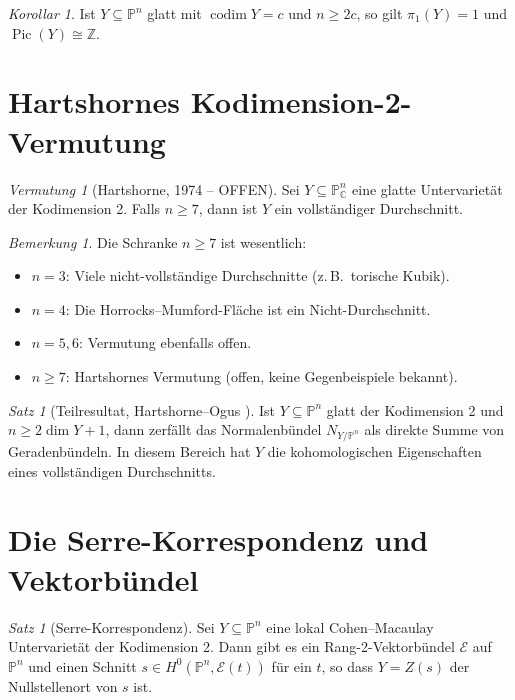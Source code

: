 \documentclass[12pt,a4paper]{amsart}
\theoremstyle{definition}
\theoremstyle{remark}
\newtheorem{satz}[theorem]{Satz}
\newtheorem{korollar}[theorem]{Korollar}
\newtheorem{vermutung}[theorem]{Vermutung}
\newtheorem{bemerkung}[theorem]{Bemerkung}
\DeclareMathOperator{\codim}{codim}
\DeclareMathOperator{\Pic}{Pic}
\newcommand{\PP}{\mathbb{P}}
\newcommand{\ZZ}{\mathbb{Z}}
\newcommand{\CC}{\mathbb{C}}
\begin{document}
\begin{korollar}
Ist $Y \subseteq \PP^n$ glatt mit $\codim Y = c$ und $n \ge 2c$, so gilt
$\pi_1(Y) = 1$ und $\Pic(Y) \cong \ZZ$.
\end{korollar}

\section{Hartshornes Kodimension-2-Vermutung}

\begin{vermutung}[Hartshorne, 1974 \cite{Hartshorne1974} -- OFFEN]
\label{verm:hartshorne}
Sei $Y \subseteq \PP^n_\CC$ eine glatte Untervarietät der Kodimension 2.
Falls $n \ge 7$, dann ist $Y$ ein vollständiger Durchschnitt.
\end{vermutung}

\begin{bemerkung}
Die Schranke $n \ge 7$ ist wesentlich:
\begin{itemize}
  \item $n = 3$: Viele nicht-vollständige Durchschnitte (z.\,B.\ torische Kubik).
  \item $n = 4$: Die Horrocks--Mumford-Fläche ist ein Nicht-Durchschnitt.
  \item $n = 5, 6$: Vermutung ebenfalls offen.
  \item $n \ge 7$: Hartshornes Vermutung (offen, keine Gegenbeispiele bekannt).
\end{itemize}
\end{bemerkung}

\begin{satz}[Teilresultat, Hartshorne--Ogus \cite{HartshorneOgus1974}]
Ist $Y \subseteq \PP^n$ glatt der Kodimension 2 und $n \ge 2\dim Y + 1$,
dann zerfällt das Normalenbündel $N_{Y/\PP^n}$ als direkte Summe von
Geradenbündeln.  In diesem Bereich hat $Y$ die kohomologischen Eigenschaften
eines vollständigen Durchschnitts.
\end{satz}

\section{Die Serre-Korrespondenz und Vektorbündel}

\begin{satz}[Serre-Korrespondenz]
Sei $Y \subseteq \PP^n$ eine lokal Cohen--Macaulay Untervarietät der Kodimension 2.
Dann gibt es ein Rang-2-Vektorbündel $\mathcal{E}$ auf $\PP^n$ und einen
Schnitt $s \in H^0(\PP^n, \mathcal{E}(t))$ für ein $t$, so dass $Y = Z(s)$
der Nullstellenort von $s$ ist.
\end{satz}
\end{document}
